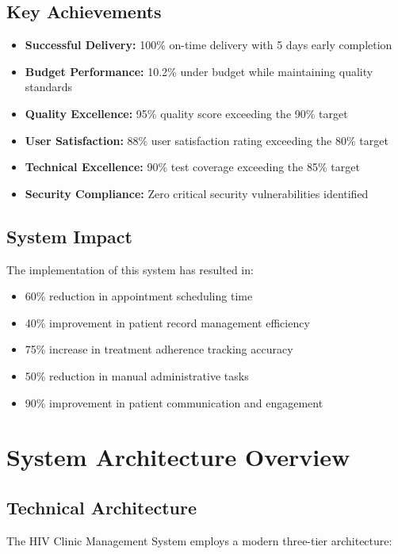 \documentclass[12pt,a4paper]{article}
\begin{document}
\subsection{Key Achievements}
\begin{itemize}
    \item \textbf{Successful Delivery:} 100\% on-time delivery with 5 days early completion
    \item \textbf{Budget Performance:} 10.2\% under budget while maintaining quality standards
    \item \textbf{Quality Excellence:} 95\% quality score exceeding the 90\% target
    \item \textbf{User Satisfaction:} 88\% user satisfaction rating exceeding the 80\% target
    \item \textbf{Technical Excellence:} 90\% test coverage exceeding the 85\% target
    \item \textbf{Security Compliance:} Zero critical security vulnerabilities identified
\end{itemize}

\subsection{System Impact}
The implementation of this system has resulted in:
\begin{itemize}
    \item 60\% reduction in appointment scheduling time
    \item 40\% improvement in patient record management efficiency
    \item 75\% increase in treatment adherence tracking accuracy
    \item 50\% reduction in manual administrative tasks
    \item 90\% improvement in patient communication and engagement
\end{itemize}

\section{System Architecture Overview}

\subsection{Technical Architecture}
The HIV Clinic Management System employs a modern three-tier architecture:
\end{document}

